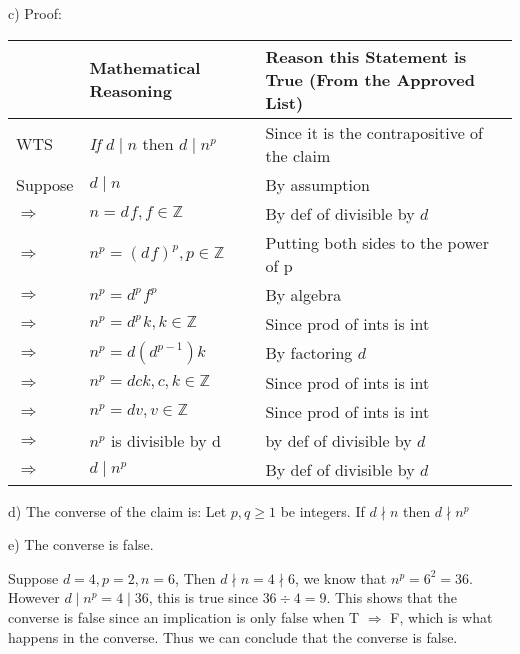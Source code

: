 \documentclass{article}
\begin{document}
c) Proof: 
\begin{flushleft}
    \begin{tabular}{|p{1.3cm}|p{3.4cm}|p{5.8cm}|}
    \hline
     & \textbf{Mathematical Reasoning} & \textbf{Reason this Statement is True (From the Approved List)} \\
    \hline
    WTS & \textit{If} $d\;|\;n$ then $d\;|\;n^p$ & Since it is the contrapositive of the claim \\
    \hline
    Suppose & $d\;|\;n$ & By assumption \\
    \hline
    $\Rightarrow$ & $n = d\hspace{1pt}f,f\in\mathbb{Z}$ & By def of divisible by $d$ \\
    \hline
    $\Rightarrow$ & $n^p = (d\hspace{1pt}f)^p,p\in\mathbb{Z}$ & Putting both sides to the power of p \\
    \hline
    $\Rightarrow$ & $n^p = d^p\hspace{1pt}f^p$ & By algebra\\
    \hline
    $\Rightarrow$ & $n^p = d^p\hspace{1pt}k, k\in\mathbb{Z}$ & Since prod of ints is int \\
    \hline
    $\Rightarrow$ & $n^p = d(d^{p-1})k$ & By factoring $d$ \\
    \hline
    $\Rightarrow$ & $n^p = dck,c,k\in\mathbb{Z}$ & Since prod of ints is int \\
    \hline
    $\Rightarrow$ & $n^p = dv,v\in\mathbb{Z}$ & Since prod of ints is int\\
    \hline
    $\Rightarrow$ & $n^p$ is divisible by d & by def of divisible by $d$ \\
    \hline
    $\Rightarrow$ & $d\;|\;n^p$ & By def of divisible by $d$ \\
    \hline
    \end{tabular}
\end{flushleft}\vspace{10pt}

d) The converse of the claim is: Let $p,q\ge1$ be integers.  If $d\nmid n$ then $d \nmid n^p$\pagebreak

e) The converse is false. \vspace{2pt}

Suppose $d = 4, p = 2, n = 6$, Then $d \nmid n = 4 \nmid 6$, we know that $n^p = 6^2 = 36$.  However $d\;|\;n^p = 4\;|\;36$, this is true since $36\div 4 = 9$.  This shows that the converse is false since an implication is only false when T $\Rightarrow$ F, which is what happens in the converse.  Thus we can conclude that the converse is false.
\end{document}
